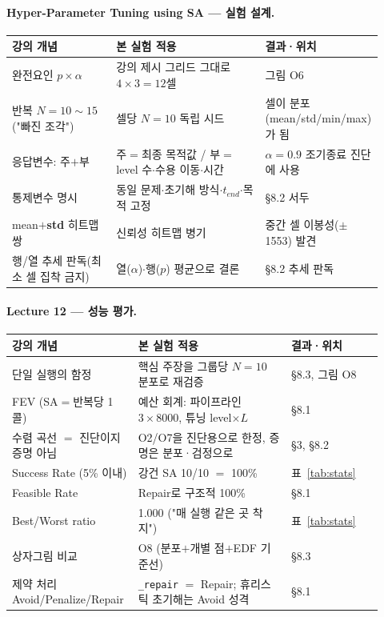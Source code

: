 \documentclass[11pt]{article}
\begin{document}
\paragraph{Hyper-Parameter Tuning using SA — 실험 설계.}
\begin{table}[H]\centering\small
\begin{tabular}{p{0.28\linewidth}p{0.40\linewidth}p{0.24\linewidth}}
\toprule
강의 개념 & 본 실험 적용 & 결과·위치 \\
\midrule
완전요인 $p\times\alpha$ & 강의 제시 그리드 그대로 $4\times3{=}12$셀 & 그림 O6 \\
반복 $N{=}10{\sim}15$ ("빠진 조각") & 셀당 $N{=}10$ 독립 시드 & 셀이 분포(mean/std/min/max)가 됨 \\
응답변수: 주$+$부 & 주$=$최종 목적값 / 부$=$level 수$\cdot$수용 이동$\cdot$시간 & $\alpha{=}0.9$ 조기종료 진단에 사용 \\
통제변수 명시 & 동일 문제$\cdot$초기해 방식$\cdot$$t_{end}$$\cdot$목적 고정 & \S8.2 서두 \\
mean$+$\textbf{std} 히트맵 쌍 & 신뢰성 히트맵 병기 & 중간 셀 이봉성($\pm$1553) 발견 \\
행/열 추세 판독(최소 셀 집착 금지) & 열($\alpha$)$\cdot$행($p$) 평균으로 결론 & \S8.2 추세 판독 \\
\bottomrule
\end{tabular}
\end{table}

\paragraph{Lecture 12 — 성능 평가.}
\begin{table}[H]\centering\small
\begin{tabular}{p{0.28\linewidth}p{0.40\linewidth}p{0.24\linewidth}}
\toprule
강의 개념 & 본 실험 적용 & 결과·위치 \\
\midrule
단일 실행의 함정 & 핵심 주장을 그룹당 $N{=}10$ 분포로 재검증 & \S8.3, 그림 O8 \\
FEV (SA$=$반복당 1콜) & 예산 회계: 파이프라인 $3{\times}8000$, 튜닝 level${\times}L$ & \S8.1 \\
수렴 곡선 $=$ 진단이지 증명 아님 & O2/O7을 진단용으로 한정, 증명은 분포·검정으로 & \S3, \S8.2 \\
Success Rate (5\% 이내) & 강건 SA 10/10 $=$ 100\% & 표~\ref{tab:stats} \\
Feasible Rate & Repair로 구조적 100\% & \S8.1 \\
Best/Worst ratio & 1.000 ("매 실행 같은 곳 착지") & 표~\ref{tab:stats} \\
상자그림 비교 & O8 (분포$+$개별 점$+$EDF 기준선) & \S8.3 \\
제약 처리 Avoid/Penalize/Repair & \texttt{\_repair} $=$ Repair; 휴리스틱 초기해는 Avoid 성격 & \S8.1 \\
\bottomrule
\end{tabular}
\end{table}
\end{document}
